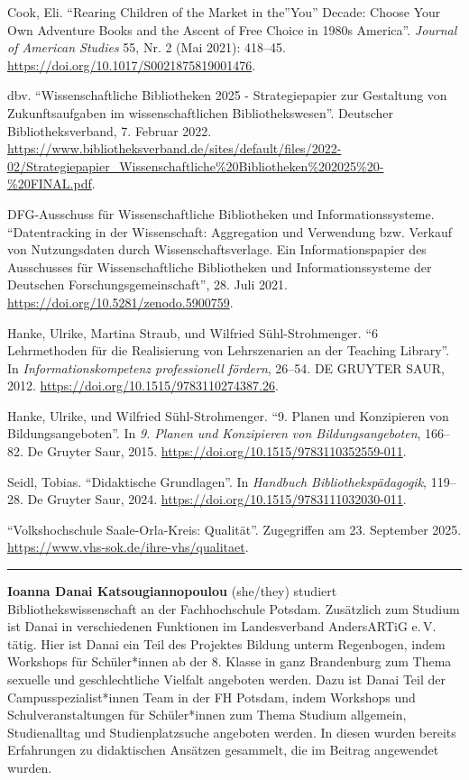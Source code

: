 \documentclass[a4paper,
fontsize=11pt,
oneside,
numbers=noperiodatend,
parskip=half-,
bibliography=totoc,
final
]{scrartcl}
\begin{document}
Cook, Eli. \enquote{Rearing Children of the Market in the}You'' Decade:
Choose Your Own Adventure Books and the Ascent of Free Choice in 1980s
America''. \emph{Journal of American Studies} 55, Nr. 2 (Mai 2021):
418--45. \url{https://doi.org/10.1017/S0021875819001476}.

dbv. \enquote{Wissenschaftliche Bibliotheken 2025 - Strategiepapier zur
Gestaltung von Zukunftsaufgaben im wissenschaftlichen Bibliothekswesen}.
Deutscher Bibliotheksverband, 7. Februar 2022.
\url{https://www.bibliotheksverband.de/sites/default/files/2022-02/Strategiepapier_Wissenschaftliche\%20Bibliotheken\%202025\%20-\%20FINAL.pdf}.

DFG-Ausschuss für Wissenschaftliche Bibliotheken und
Informationssysteme. \enquote{Datentracking in der Wissenschaft:
Aggregation und Verwendung bzw. Verkauf von Nutzungsdaten durch
Wissenschaftsverlage. Ein Informationspapier des Ausschusses für
Wissenschaftliche Bibliotheken und Informationssysteme der Deutschen
Forschungsgemeinschaft}, 28. Juli 2021.
\url{https://doi.org/10.5281/zenodo.5900759}.

Hanke, Ulrike, Martina Straub, und Wilfried Sühl-Strohmenger. \enquote{6
Lehrmethoden für die Realisierung von Lehrszenarien an der Teaching
Library}. In \emph{Informationskompetenz professionell fördern}, 26--54.
DE GRUYTER SAUR, 2012. \url{https://doi.org/10.1515/9783110274387.26}.

Hanke, Ulrike, und Wilfried Sühl-Strohmenger. \enquote{9. Planen und
Konzipieren von Bildungsangeboten}. In \emph{9. Planen und Konzipieren
von Bildungsangeboten}, 166--82. De Gruyter Saur, 2015.
\url{https://doi.org/10.1515/9783110352559-011}.

Seidl, Tobias. \enquote{Didaktische Grundlagen}. In \emph{Handbuch
Bibliothekspädagogik}, 119--28. De Gruyter Saur, 2024.
\url{https://doi.org/10.1515/9783111032030-011}.

\enquote{Volkshochschule Saale-Orla-Kreis: Qualität}. Zugegriffen am 23.
September 2025. \url{https://www.vhs-sok.de/ihre-vhs/qualitaet}.

\begin{center}\rule{0.5\linewidth}{0.5pt}\end{center}

\textbf{Ioanna Danai Katsougiannopoulou} (she/they) studiert
Bibliothekswissenschaft an der Fachhochschule Potsdam. Zusätzlich zum
Studium ist Danai in verschiedenen Funktionen im Landesverband
AndersARTiG e.\,V. tätig. Hier ist Danai ein Teil des Projektes Bildung
unterm Regenbogen, indem Workshops für Schüler*innen ab der 8.
Klasse in ganz Brandenburg zum Thema sexuelle und geschlechtliche
Vielfalt angeboten werden. Dazu ist Danai Teil der
Campusspezialist*innen Team in der FH Potsdam, indem Workshops und
Schulveranstaltungen für Schüler*innen zum Thema Studium allgemein,
Studienalltag und Studienplatzsuche angeboten werden. In diesen wurden
bereits Erfahrungen zu didaktischen Ansätzen gesammelt, die im Beitrag
angewendet wurden.
\end{document}
